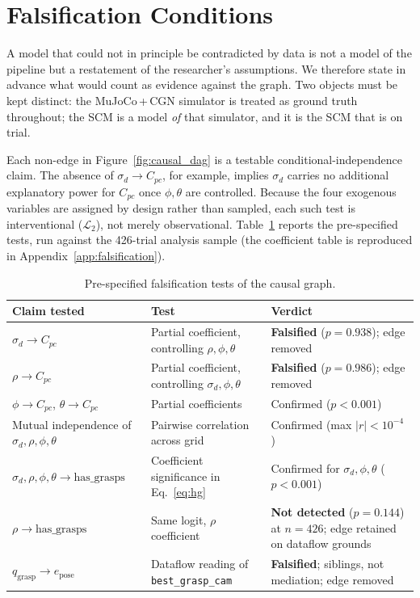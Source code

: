 \documentclass[11pt,a4paper]{report}
\begin{document}
\section{Falsification Conditions}
\label{sec:falsification}

A model that could not in principle be contradicted by data is not a model of the pipeline but a restatement of the researcher's assumptions. We therefore state in advance what would count as evidence against the graph. Two objects must be kept distinct: the MuJoCo\,+\,CGN simulator is treated as ground truth throughout; the SCM is a model \emph{of} that simulator, and it is the SCM that is on trial.

Each non-edge in Figure~\ref{fig:causal_dag} is a testable conditional-independence claim. The absence of $\sigma_d \to C_{pc}$, for example, implies $\sigma_d$ carries no additional explanatory power for $C_{pc}$ once $\phi,\theta$ are controlled. Because the four exogenous variables are assigned by design rather than sampled, each such test is interventional ($\mathcal{L}_2$), not merely observational. Table~\ref{tab:falsification} reports the pre-specified tests, run against the 426-trial analysis sample (the coefficient table is reproduced in Appendix~\ref{app:falsification}).

\begin{table}[t]
  \caption{Pre-specified falsification tests of the causal graph.}
  \label{tab:falsification}
  \centering
  \small
  \begin{tabular}{p{5.3cm}p{4.7cm}l}
    \toprule
    \textbf{Claim tested} & \textbf{Test} & \textbf{Verdict} \\
    \midrule
    $\sigma_d \to C_{pc}$ & Partial coefficient, controlling $\rho,\phi,\theta$ & \textbf{Falsified} ($p=0.938$); edge removed \\
    $\rho \to C_{pc}$ & Partial coefficient, controlling $\sigma_d,\phi,\theta$ & \textbf{Falsified} ($p=0.986$); edge removed \\
    $\phi \to C_{pc}$, $\theta \to C_{pc}$ & Partial coefficients & Confirmed ($p<0.001$) \\
    Mutual independence of $\sigma_d,\rho,\phi,\theta$ & Pairwise correlation across grid & Confirmed (max $|r| < 10^{-4}$) \\
    $\sigma_d,\rho,\phi,\theta \to \text{has\_grasps}$ & Coefficient significance in Eq.~\eqref{eq:hg} & Confirmed for $\sigma_d,\phi,\theta$ ($p<0.001$) \\
    $\rho \to \text{has\_grasps}$ & Same logit, $\rho$ coefficient & \textbf{Not detected} ($p=0.144$) at $n=426$; edge retained on dataflow grounds \\
    $q_{\text{grasp}} \to e_{\text{pose}}$ & Dataflow reading of \texttt{best\_grasp\_cam} & \textbf{Falsified}; siblings, not mediation; edge removed \\
    \bottomrule
  \end{tabular}
\end{table}
\end{document}
